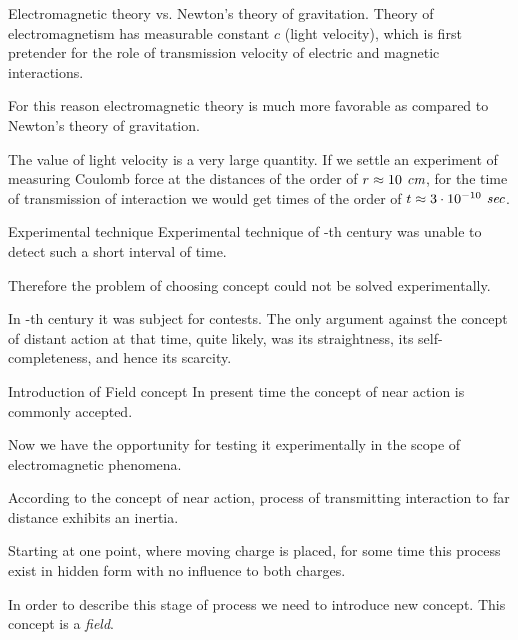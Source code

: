 \documentclass[10pt]{beamer}
\begin{document}
\begin{frame}[fragile]{Electromagnetic theory vs.
Newton's theory of gravitation.}
%
\alert{Theory of electromagnetism has measurable constant $c$ (light
velocity)}, which is first pretender for the role of
transmission velocity of electric and magnetic interactions. 

For this
reason \alert{electromagnetic theory is much more favorable as compared to
Newton's theory of gravitation}.

    The value of light velocity is a very large quantity. If we settle
an experiment of measuring Coulomb force at the distances of the order of
$r\approx 10\text{\it\ cm}$, for the time of transmission of interaction
we would get times of the order of $t\approx 3\cdot 10^{-10}\text{\it\
sec}$. 



\end{frame}
\begin{frame}[fragile]{Experimental technique}
%
Experimental technique of \uppercase\expandafter{}-th century was unable to detect such a short interval of time.

Therefore the problem of choosing concept could not be solved
experimentally. 

In \uppercase\expandafter{}-th century
it was subject for contests. The only argument against the concept of
distant action at that time, quite likely, was its straightness, its
self-completeness, and hence its scarcity.
%
\end{frame}
\begin{frame}[fragile]{Introduction of Field concept}
%
In present time \alert{the concept of near action is commonly accepted}. 

Now
we have the opportunity for testing it experimentally in the scope of
electromagnetic phenomena. 

According to the concept of near action, process of transmitting
interaction to far distance exhibits an inertia. 

Starting at one point,
where moving charge is placed, for some time this process exist in
hidden form with no influence to both charges. 

In order to describe
this stage of process we need to introduce new concept. \alert{This concept
is a {\it field}}.
%
\end{frame}
\end{document}
